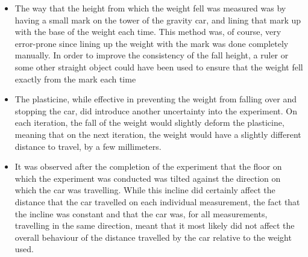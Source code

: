 \documentclass[titlepage,12pt]{article}
\begin{document}
            \begin{itemize}
                \item The way that the height from which the weight fell was
                    measured was by having a small mark on the tower of the
                    gravity car, and  lining that mark up with the base of the
                    weight each time. This method was, of course, very
                    error-prone since lining up the weight with the mark was
                    done completely manually. In order to improve the
                    consistency of the fall height, a ruler or some other
                    straight object could have been used to ensure that the
                    weight fell exactly from the mark each time

                \item The plasticine, while effective in preventing the weight
                    from falling over and stopping the car, did introduce
                    another uncertainty into the experiment. On each iteration,
                    the fall of the weight would slightly deform the plasticine,
                    meaning that on the next iteration, the weight would have a
                    slightly different distance to travel, by a few millimeters. 

                \item It was observed after the completion of the experiment
                    that the floor on which the experiment was conducted was
                    tilted against the direction on which the car was
                    travelling. While this incline did certainly affect the
                    distance that the car travelled on each individual
                    measurement, the fact that the incline was constant and that
                    the car was, for all measurements, travelling in the same
                    direction, meant that it most likely did not affect the
                    overall behaviour of the distance travelled by the car
                    relative to the weight used. 
            \end{itemize}
\end{document}
